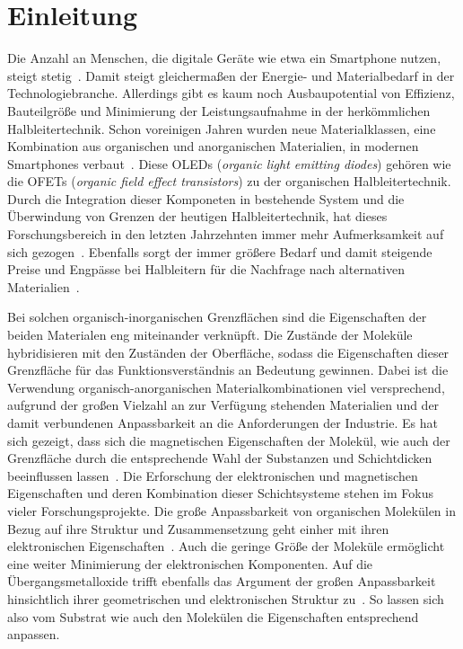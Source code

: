 \chapter{Einleitung}
    Die Anzahl an Menschen, die digitale Geräte wie etwa ein Smartphone nutzen, steigt stetig~\cite{Statista}.
    Damit steigt gleichermaßen der Energie- und Materialbedarf in der Technologiebranche.
    Allerdings gibt es kaum noch Ausbaupotential von Effizienz, Bauteilgröße und Minimierung der Leistungsaufnahme in der herkömmlichen Halbleitertechnik.
    Schon voreinigen Jahren wurden neue Materialklassen, eine Kombination aus organischen und anorganischen Materialien, in modernen Smartphones verbaut~\cite{MAC}.
    Diese OLEDs (\textit{organic light emitting diodes}) gehören wie die OFETs (\textit{organic field effect transistors}) zu der organischen Halbleitertechnik.
    Durch die Integration dieser Komponeten in bestehende System und die Überwindung von Grenzen der heutigen Halbleitertechnik, hat dieses Forschungsbereich in den letzten Jahrzehnten immer mehr Aufmerksamkeit auf sich gezogen~\cite{Uni-Tübingen}.
    Ebenfalls sorgt der immer größere Bedarf und damit steigende Preise und Engpässe bei Halbleitern für die Nachfrage nach alternativen Materialien~\cite{Idealo}.

    Bei solchen organisch-inorganischen Grenzflächen sind die Eigenschaften der beiden Materialen eng miteinander verknüpft.
    Die Zustände der Moleküle hybridisieren mit den Zuständen der Oberfläche, sodass die Eigenschaften dieser Grenzfläche für das Funktionsverständnis an Bedeutung gewinnen.
    Dabei ist die Verwendung organisch-anorganischen Materialkombinationen viel versprechend, aufgrund der großen Vielzahl an zur Verfügung stehenden Materialien und der damit verbundenen Anpassbarkeit an die Anforderungen der Industrie.
    Es hat sich gezeigt, dass sich die magnetischen Eigenschaften der Molekül, wie auch der Grenzfläche durch die entsprechende Wahl der Substanzen und Schichtdicken beeinflussen lassen~\cite{IF_16}.
    Die Erforschung der elektronischen und magnetischen Eigenschaften und deren Kombination dieser Schichtsysteme stehen im Fokus vieler Forschungsprojekte.
    Die große Anpassbarkeit von organischen Molekülen in Bezug auf ihre Struktur und Zusammensetzung geht einher mit ihren elektronischen Eigenschaften~\cite{scholl_chapter_2018}.
    Auch die geringe Größe der Moleküle ermöglicht eine weiter Minimierung der elektronischen Komponenten.
    Auf die Übergangsmetalloxide trifft ebenfalls das Argument der großen Anpassbarkeit hinsichtlich ihrer geometrischen und elektronischen Struktur zu~\cite{5A_4}.
    So lassen sich also vom Substrat wie auch den Molekülen die Eigenschaften entsprechend anpassen. %

